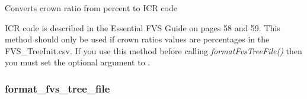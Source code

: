 \documentclass[letterpaper,10pt,english]{sphinxmanual}
\begin{document}
\begin{fulllineitems}
\label{Inventory:fuels.Inventory.crwratio_percent_to_code}
Converts crown ratio from percent to ICR code

ICR code is described in the Essential FVS Guide on pages 58 and 59.
This method should only be used if crown ratios values are percentages
in the FVS\_TreeInit.csv.  If you use this method before calling
\emph{formatFvsTreeFile()} then you must set the optional argument
 to .

\end{fulllineitems}



\subsubsection{format\_fvs\_tree\_file}
\label{Inventory:format-fvs-tree-file}
\end{document}

